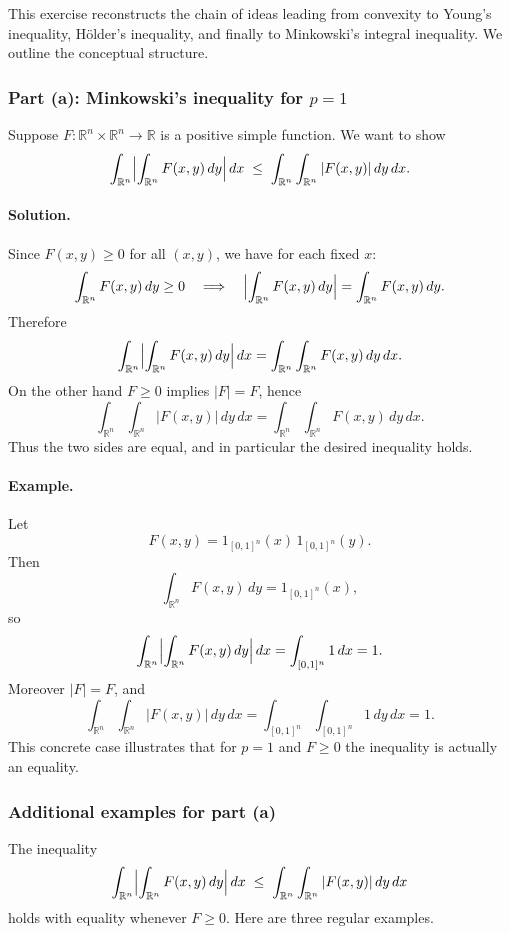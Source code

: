 \documentclass[12pt,a4paper]{article}
\theoremstyle{plain}
\theoremstyle{definition}
\theoremstyle{remark}
\theoremstyle{remark}
\begin{document}
This exercise reconstructs the chain of ideas leading from convexity to
Young's inequality, Hölder's inequality, and finally to Minkowski's
integral inequality.  We outline the conceptual structure.


\subsubsection*{Part (a): Minkowski's inequality for $p=1$}

Suppose $F:\mathbb{R}^n\times\mathbb{R}^n\to\mathbb{R}$ is a positive
simple function. We want to show
\[
\int_{\mathbb{R}^n}
\Bigl|\int_{\mathbb{R}^n} F(x,y)\,dy\Bigr|\,dx
\;\le\;
\int_{\mathbb{R}^n}\int_{\mathbb{R}^n} |F(x,y)|\,dy\,dx.
\]

\paragraph*{Solution.}
Since $F(x,y)\ge0$ for all $(x,y)$, we have for each fixed $x$:
\[
\int_{\mathbb{R}^n} F(x,y)\,dy \ge 0
\quad\Longrightarrow\quad
\Bigl|\int_{\mathbb{R}^n}F(x,y)\,dy\Bigr|
= \int_{\mathbb{R}^n}F(x,y)\,dy.
\]
Therefore
\[
\int_{\mathbb{R}^n}
\Bigl|\int_{\mathbb{R}^n} F(x,y)\,dy\Bigr|\,dx
= \int_{\mathbb{R}^n}\int_{\mathbb{R}^n} F(x,y)\,dy\,dx.
\]
On the other hand $F\ge0$ implies $|F|=F$, hence
\[
\int_{\mathbb{R}^n}\int_{\mathbb{R}^n} |F(x,y)|\,dy\,dx
= \int_{\mathbb{R}^n}\int_{\mathbb{R}^n} F(x,y)\,dy\,dx.
\]
Thus the two sides are equal, and in particular the desired inequality
holds.

\medskip

\paragraph*{Example.}
Let
\[
F(x,y) = 1_{[0,1]^n}(x)\,1_{[0,1]^n}(y).
\]
Then
\[
\int_{\mathbb{R}^n} F(x,y)\,dy = 1_{[0,1]^n}(x),
\]
so
\[
\int_{\mathbb{R}^n}
\Bigl|\int_{\mathbb{R}^n} F(x,y)\,dy\Bigr|\,dx
= \int_{[0,1]^n} 1\,dx = 1.
\]
Moreover $|F|=F$, and
\[
\int_{\mathbb{R}^n}\int_{\mathbb{R}^n} |F(x,y)|\,dy\,dx
= \int_{[0,1]^n}\int_{[0,1]^n} 1\,dy\,dx
= 1.
\]
This concrete case illustrates that for $p=1$ and $F\ge0$ the inequality
is actually an equality.


\subsubsection*{Additional examples for part (a)}

The inequality
\[
\int_{\mathbb{R}^n}
\Bigl|\int_{\mathbb{R}^n}F(x,y)\,dy\Bigr|\,dx
\;\le\;
\int_{\mathbb{R}^n}\int_{\mathbb{R}^n}|F(x,y)|\,dy\,dx
\]
holds with equality whenever $F\ge0$.  Here are three regular examples.
\end{document}
